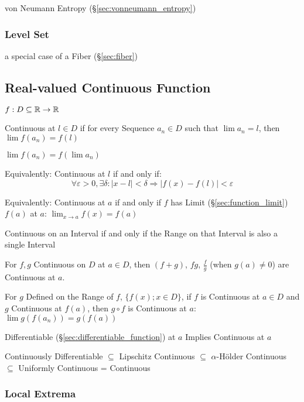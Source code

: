 \fist von Neumann Entropy (\S\ref{sec:vonneumann_entropy})



\subsubsection{Level Set}\label{sec:level_set}

a special case of a Fiber (\S\ref{sec:fiber})



\subsection{Real-valued Continuous Function}\label{sec:real_continuous}

$f : D \subseteq \mathbb{R} \rightarrow \mathbb{R}$

Continuous at $l \in D$ if for every Sequence $a_n \in D$ such that
$\lim a_n = l$, then $\lim f(a_n) = f(l)$

$\lim f (a_n) = f (\lim a_n)$

Equivalently: Continuous at $l$ if and only if:
\[
  \forall \varepsilon > 0, \exists \delta :
  |x - l| < \delta \Rightarrow |f(x) - f(l)| < \varepsilon
\]

Equivalently: Continuous at $a$ if and only if $f$ has Limit
(\S\ref{sec:function_limit}) $f(a)$ at $a$: $\lim_{x \rightarrow
  a}f(x) = f(a)$

Continuous on an Interval if and only if the Range on that Interval is
also a single Interval

For $f,g$ Continuous on $D$ at $a \in D$, then $(f + g)$, $f g$,
$\frac{f}{g}$ (when $g(a) \neq 0$) are Continuous at $a$.

For $g$ Defined on the Range of $f$, $\{ f(x); x \in D\}$, if $f$ is
Continuous at $a \in D$ and $g$ Continuous at $f(a)$, then $g \circ f$
is Continuous at $a$: $\lim g(f(a_n)) = g(f(a))$

Differentiable (\S\ref{sec:differentiable_function}) at $a$ Implies
Continuous at $a$

Continuously Differentiable $\subseteq$ Lipschitz Continuous $\subseteq$
$\alpha$-H\"older Continuous $\subseteq$ Uniformly Continuous = Continuous



\subsubsection{Local Extrema}\label{sec:local_extrema}

